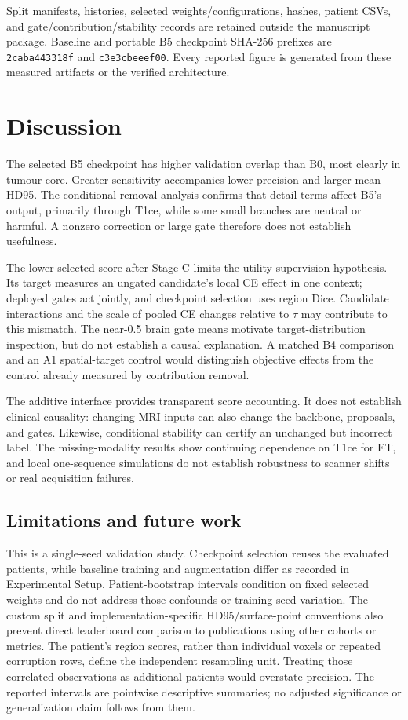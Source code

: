 \documentclass[conference]{IEEEtran}
\begin{document}
Split manifests, histories, selected weights/configurations, hashes, patient CSVs, and gate/contribution/stability records are retained outside the manuscript package. Baseline and portable B5 checkpoint SHA-256 prefixes are \texttt{2caba443318f} and \texttt{c3e3cbeeef00}. Every reported figure is generated from these measured artifacts or the verified architecture.

\section{Discussion}
The selected B5 checkpoint has higher validation overlap than B0, most clearly in tumour core. Greater sensitivity accompanies lower precision and larger mean HD95. The conditional removal analysis confirms that detail terms affect B5's output, primarily through T1ce, while some small branches are neutral or harmful. A nonzero correction or large gate therefore does not establish usefulness.

The lower selected score after Stage C limits the utility-supervision hypothesis. Its target measures an ungated candidate's local CE effect in one context; deployed gates act jointly, and checkpoint selection uses region Dice. Candidate interactions and the scale of pooled CE changes relative to $\tau$ may contribute to this mismatch. The near-0.5 brain gate means motivate target-distribution inspection, but do not establish a causal explanation. A matched B4 comparison and an A1 spatial-target control would distinguish objective effects from the control already measured by contribution removal.

The additive interface provides transparent score accounting. It does not establish clinical causality: changing MRI inputs can also change the backbone, proposals, and gates. Likewise, conditional stability can certify an unchanged but incorrect label. The missing-modality results show continuing dependence on T1ce for ET, and local one-sequence simulations do not establish robustness to scanner shifts or real acquisition failures.

\subsection{Limitations and future work}
This is a single-seed validation study. Checkpoint selection reuses the evaluated patients, while baseline training and augmentation differ as recorded in Experimental Setup. Patient-bootstrap intervals condition on fixed selected weights and do not address those confounds or training-seed variation. The custom split and implementation-specific HD95/surface-point conventions also prevent direct leaderboard comparison to publications using other cohorts or metrics. The patient's region scores, rather than individual voxels or repeated corruption rows, define the independent resampling unit. Treating those correlated observations as additional patients would overstate precision. The reported intervals are pointwise descriptive summaries; no adjusted significance or generalization claim follows from them.
\end{document}
